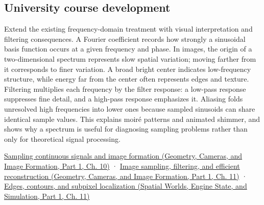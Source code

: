 \subsection{University course development}\label{appendix-b60686ba06a1-university-course-development}

\hypertarget{appendix-b60686ba06a1-university-course-development}{}

Extend the existing frequency-domain treatment with visual interpretation and filtering consequences. A Fourier coefficient records how strongly a sinusoidal basis function occurs at a given frequency and phase. In images, the origin of a two-dimensional spectrum represents slow spatial variation; moving farther from it corresponds to finer variation. A broad bright center indicates low-frequency structure, while energy far from the center often represents edges and texture. Filtering multiplies each frequency by the filter response: a low-pass response suppresses fine detail, and a high-pass response emphasizes it. Aliasing folds unresolved high frequencies into lower ones because sampled sinusoids can share identical sample values. This explains moiré patterns and animated shimmer, and shows why a spectrum is useful for diagnosing sampling problems rather than only for theoretical signal processing.

\href{../03-Geometry-Cameras-and-Image-Formation-P01/main.pdf\#nameddest=03-visual-computing-i-ch003-sampling-continuous-signals-and-image-formation}{Sampling continuous signals and image formation (Geometry, Cameras, and Image Formation, Part 1, Ch. 10)} · \href{../03-Geometry-Cameras-and-Image-Formation-P01/main.pdf\#nameddest=03-visual-computing-i-ch004-image-sampling-filtering-and-efficient-reconstruction}{Image sampling, filtering, and efficient reconstruction (Geometry, Cameras, and Image Formation, Part 1, Ch. 11)} · \href{../05-Spatial-Worlds-Engine-State-and-Simulation-P01/main.pdf\#nameddest=04-visual-computing-ii-ch030-edges-contours-and-subpixel-localization}{Edges, contours, and subpixel localization (Spatial Worlds, Engine State, and Simulation, Part 1, Ch. 11)}
